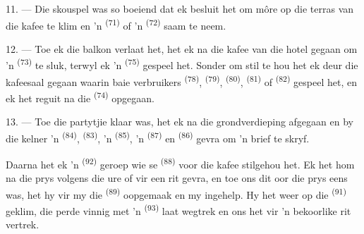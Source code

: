 \VUsaut{3.0mm}
\VUsaut{3.0mm}

11. --- Die skouspel was so boeiend dat ek besluit het om môre op die terras van die
kafee te klim en 'n  \textsuperscript{(71)} of 'n 
\textsuperscript{(72)} saam te neem.

12. --- Toe ek die balkon verlaat het, het ek na die kafee van die hotel gegaan om 'n
 \textsuperscript{(73)} te sluk, terwyl ek 'n 
\textsuperscript{(75)} gespeel het. Sonder om stil te hou het ek deur die kafeesaal
gegaan waarin baie verbruikers  \textsuperscript{(78)}, 
\textsuperscript{(79)},  \textsuperscript{(80)}, 
\textsuperscript{(81)} of  \textsuperscript{(82)} gespeel het, en ek het
reguit na die  \textsuperscript{(74)} opgegaan.

13. --- Toe die partytjie klaar was, het ek na die grondverdieping afgegaan en by die
kelner 'n  \textsuperscript{(84)}, 
\textsuperscript{(83)}, 'n  \textsuperscript{(85)}, 'n 
\textsuperscript{(87)} en  \textsuperscript{(86)} gevra om 'n brief te skryf.

Daarna het ek 'n  \textsuperscript{(92)} geroep wie se 
\textsuperscript{(88)} voor die kafee stilgehou het. Ek het hom na die prys volgens die
ure of vir een rit gevra, en toe ons dit oor die prys eens was, het hy vir my die
 \textsuperscript{(89)} oopgemaak en my ingehelp. Hy het weer op die
 \textsuperscript{(91)} geklim, die perde vinnig met 'n 
\textsuperscript{(93)} laat wegtrek en ons het vir 'n bekoorlike rit vertrek.
\VUsaut{6.0mm}
\VUfilet{22mm}
